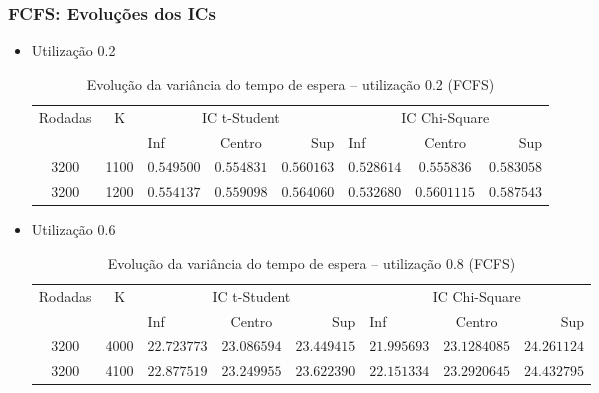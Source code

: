 \documentclass[a4paper]{article}
\begin{document}
\subsubsection{FCFS: Evoluções dos ICs}
\begin{itemize}
    \item Utilização 0.2
    \begin{table}[h!]
        \centering
        \begin{tabular}{|c|c|lcr|lcr|}\hline
            \multirow{2}{3.75em}{Rodadas}
                & \multirow{2}{1em}{K}
                & \multicolumn{3}{|c|}{IC t-Student}
                & \multicolumn{3}{|c|}{IC Chi-Square} \\
            && Inf & Centro & Sup & Inf & Centro & Sup \\\hline
            3200 & 1100
                &$ 0.549500 $&$ 0.554831 $&$ 0.560163 $
                &$ 0.528614 $&$ 0.555836 $&$ 0.583058 $\\\hline
            3200 & 1200
                &$ 0.554137 $&$ 0.559098 $&$ 0.564060 $
                &$ 0.532680 $&$ 0.5601115 $&$ 0.587543 $\\\hline
        \end{tabular}
        \caption{Evolução da variância do tempo de espera --
            utilização 0.2 (FCFS)}
    \end{table}
    \item Utilização 0.6
    \begin{table}[h!]
        \centering
        \begin{tabular}{|c|c|lcr|lcr|}\hline
            \multirow{2}{3.75em}{Rodadas}
                & \multirow{2}{1em}{K}
                & \multicolumn{3}{|c|}{IC t-Student}
                & \multicolumn{3}{|c|}{IC Chi-Square} \\
            && Inf & Centro & Sup & Inf & Centro & Sup \\\hline
            3200 & 4000
                &$ 22.723773 $&$ 23.086594 $&$ 23.449415 $
                &$ 21.995693 $&$ 23.1284085 $&$ 24.261124 $\\\hline
            3200 & 4100
                &$ 22.877519 $&$ 23.249955 $&$ 23.622390 $
                &$ 22.151334 $&$ 23.2920645 $&$ 24.432795 $\\\hline
        \end{tabular}
        \caption{Evolução da variância do tempo de espera --
            utilização 0.8 (FCFS)}
    \end{table}
\end{itemize}
\end{document}
